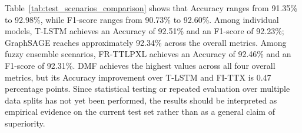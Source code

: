 \documentclass[10pt,twoside]{article}
\begin{document}
Table~\ref{tab:test_scenarios_comparison} shows that Accuracy ranges from 91.35\% to 92.98\%, while F1-score ranges from 90.73\% to 92.60\%. Among individual models, T-LSTM achieves an Accuracy of 92.51\% and an F1-score of 92.23\%; GraphSAGE reaches approximately 92.34\% across the overall metrics. Among fuzzy ensemble scenarios, FR-TTLPXL achieves an Accuracy of 92.46\% and an F1-score of 92.31\%. DMF achieves the highest values across all four overall metrics, but its Accuracy improvement over T-LSTM and FI-TTX is 0.47 percentage points. Since statistical testing or repeated evaluation over multiple data splits has not yet been performed, the results should be interpreted as empirical evidence on the current test set rather than as a general claim of superiority.

\begingroup
\fontsize{9pt}{11pt}\selectfont
\renewcommand{\arraystretch}{1.08}
\setlength{\tabcolsep}{3pt}
\end{document}
